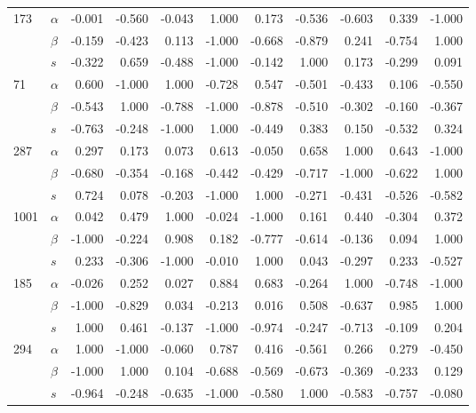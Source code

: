 \begin{longtable}{llrrrrrrrrr}
\cline{1-11}
\multirow{3}{*}{173} & $\alpha$ & -0.001 & -0.560 & -0.043 &  1.000 &  0.173 & -0.536 & -0.603 &  0.339 & -1.000 \\
     & $\beta$ & -0.159 & -0.423 &  0.113 & -1.000 & -0.668 & -0.879 &  0.241 & -0.754 &  1.000 \\
     & $s$ & -0.322 &  0.659 & -0.488 & -1.000 & -0.142 &  1.000 &  0.173 & -0.299 &  0.091 \\
\cline{1-11}
\multirow{3}{*}{71} & $\alpha$ &  0.600 & -1.000 &  1.000 & -0.728 &  0.547 & -0.501 & -0.433 &  0.106 & -0.550 \\
     & $\beta$ & -0.543 &  1.000 & -0.788 & -1.000 & -0.878 & -0.510 & -0.302 & -0.160 & -0.367 \\
     & $s$ & -0.763 & -0.248 & -1.000 &  1.000 & -0.449 &  0.383 &  0.150 & -0.532 &  0.324 \\
\cline{1-11}
\multirow{3}{*}{287} & $\alpha$ &  0.297 &  0.173 &  0.073 &  0.613 & -0.050 &  0.658 &  1.000 &  0.643 & -1.000 \\
     & $\beta$ & -0.680 & -0.354 & -0.168 & -0.442 & -0.429 & -0.717 & -1.000 & -0.622 &  1.000 \\
     & $s$ &  0.724 &  0.078 & -0.203 & -1.000 &  1.000 & -0.271 & -0.431 & -0.526 & -0.582 \\
\cline{1-11}
\multirow{3}{*}{1001} & $\alpha$ &  0.042 &  0.479 &  1.000 & -0.024 & -1.000 &  0.161 &  0.440 & -0.304 &  0.372 \\
     & $\beta$ & -1.000 & -0.224 &  0.908 &  0.182 & -0.777 & -0.614 & -0.136 &  0.094 &  1.000 \\
     & $s$ &  0.233 & -0.306 & -1.000 & -0.010 &  1.000 &  0.043 & -0.297 &  0.233 & -0.527 \\
\cline{1-11}
\multirow{3}{*}{185} & $\alpha$ & -0.026 &  0.252 &  0.027 &  0.884 &  0.683 & -0.264 &  1.000 & -0.748 & -1.000 \\
     & $\beta$ & -1.000 & -0.829 &  0.034 & -0.213 &  0.016 &  0.508 & -0.637 &  0.985 &  1.000 \\
     & $s$ &  1.000 &  0.461 & -0.137 & -1.000 & -0.974 & -0.247 & -0.713 & -0.109 &  0.204 \\
\cline{1-11}
\multirow{3}{*}{294} & $\alpha$ &  1.000 & -1.000 & -0.060 &  0.787 &  0.416 & -0.561 &  0.266 &  0.279 & -0.450 \\
     & $\beta$ & -1.000 &  1.000 &  0.104 & -0.688 & -0.569 & -0.673 & -0.369 & -0.233 &  0.129 \\
     & $s$ & -0.964 & -0.248 & -0.635 & -1.000 & -0.580 &  1.000 & -0.583 & -0.757 & -0.080 \\

\end{longtable}
